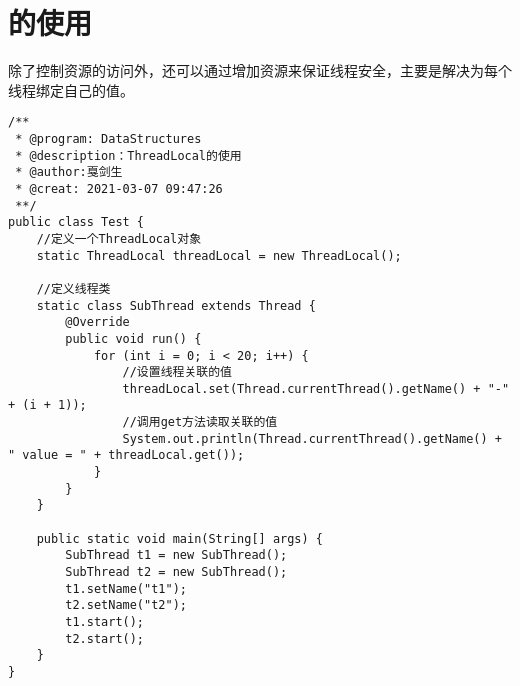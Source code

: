 \documentclass[a4paper]{report}
\begin{document}
\section{的使用}
除了控制资源的访问外，还可以通过增加资源来保证线程安全，主要是解决为每个线程绑定自己的值。
\begin{lstlisting}
/**
 * @program: DataStructures
 * @description：ThreadLocal的使用
 * @author:戛剑生
 * @creat: 2021-03-07 09:47:26
 **/
public class Test {
    //定义一个ThreadLocal对象
    static ThreadLocal threadLocal = new ThreadLocal();

    //定义线程类
    static class SubThread extends Thread {
        @Override
        public void run() {
            for (int i = 0; i < 20; i++) {
                //设置线程关联的值
                threadLocal.set(Thread.currentThread().getName() + "-" + (i + 1));
                //调用get方法读取关联的值
                System.out.println(Thread.currentThread().getName() + " value = " + threadLocal.get());
            }
        }
    }

    public static void main(String[] args) {
        SubThread t1 = new SubThread();
        SubThread t2 = new SubThread();
        t1.setName("t1");
        t2.setName("t2");
        t1.start();
        t2.start();
    }
}
\end{lstlisting}
\end{document}
